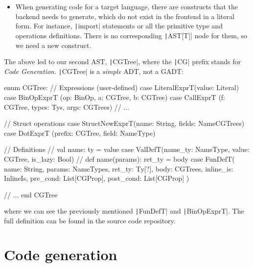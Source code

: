 \documentclass[11pt]{article}
\newcommand{\ScalaI}[1]{\texttt|#1|}
\newcommand{\textsfi}[1]{\textsf{\textit{#1}}}
\begin{document}
\begin{itemize}
  \item When generating code for a target language, there are constructs that the backend needs to generate, which do not exist in the frontend in a literal form. For instance, \ScalaI{import} statements or all the primitive type and operations definitions. There is no corresponding \ScalaI{AST[T]} node for them, so we need a new construct.
\end{itemize}
 
\noindent The above led to our second AST, \ScalaI{CGTree}, where the \ScalaI{CG} prefix stands for \textit{Code Generation}. \ScalaI{CGTree} is a \textit{simple} ADT, not a GADT:

\begin{ScalaBlockSimple}
enum CGTree:
  // Expressions (user-defined)
  case LiteralExprT(value: Literal)
  case BinOpExprT  (op: BinOp,   a: CGTree, b: CGTree)
  case CallExprT   (f: CGTree, types: Tys, args: CGTrees)
  // ...

  // Struct operations
  case StructNewExprT(name: String, fields: NameCGTrees)
  case DotExprT      (prefix: CGTree, field: NameType)
  
  // Definitions
  // val name: ty = value 
  case ValDefT(name_ty: NameType, value: CGTree, is_lazy: Bool)
  // def name(params): ret_ty = body
  case FunDefT(
    name: String,
    params: NameTypes,
    ret_ty: Ty[?],
    body: CGTrees,
    inline_is: InlineIs,
    pre_cond: List[CGProp],
    post_cond: List[CGProp]
  )

  // ...
end CGTree
\end{ScalaBlockSimple}

\noindent where we can see the previously mentioned \ScalaI{FunDefT} and \ScalaI{BinOpExprT}. The full definition can be found in the source code repository.

\section{Code generation}
\label{sec:code:gen}

\newcommand{\codeIN}{\ensuremath{\textsfi{code}_\textsfi{IN}}\xspace}
\newcommand{\codeOUT}{\ensuremath{\textsfi{code}_\textsfi{OUT}}\xspace}
\newcommand{\visitorAST}{\ensuremath{\textsfi{Visitor}_\textsfi{AST[T]}}\xspace}
\newcommand{\visitorCGTree}{\ensuremath{\textsfi{Visitor}_\textsfi{CGTree}}\xspace}
\end{document}
